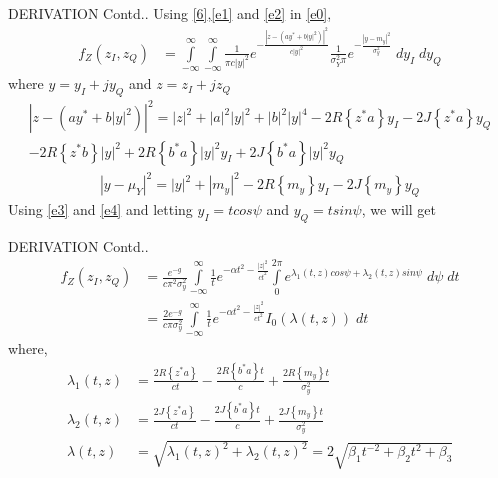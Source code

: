 \documentclass{beamer}
\providecommand{\brak}[1]{\ensuremath{\left(#1\right)}}
\providecommand{\cbrak}[1]{\ensuremath{\left\{#1\right\}}}
\begin{document}
\begin{frame}{DERIVATION Contd..}
    Using \eqref{6},\eqref{e1} and \eqref{e2} in \eqref{e0},
    \begin{align}
         f_{Z}\brak{z_I,z_Q}&=\int\limits_{-\infty}^{\infty}\int\limits_{-\infty}^{\infty}\frac{1}{\pi c|y|^2}e^{-\frac{|{z-\brak{ay^*+b|y|^2}}|^2}{c|y|^2}}\frac{1}{\sigma_Y^2\pi}e^{-\frac{|{y-m_y}|^2}{\sigma_y^2}} \;dy_I\;dy_Q
    \end{align}
    where $y=y_I+jy_Q$ and $z=z_I+jz_Q$
    \begin{multline}
        |{z-\brak{a y^*+b|y|^2}}|^2=|z|^2+|a|^2|y|^2+|b|^2|y|^4-2R\cbrak{z^*a}y_I-2J\cbrak{z^*a}y_Q\\-2R\cbrak{z^*b}|y|^2+2R\cbrak{b^*a}|y|^2y_I+2J\cbrak{b^*a}|y|^2y_Q\label{e3}
    \end{multline}
    \begin{align}
        |{y-\mu_Y}|^2=|y|^2+|m_y|^2-2R\cbrak{m_y}y_I-2J\cbrak{m_y}y_Q\label{e4}
    \end{align}
    Using \eqref{e3} and \eqref{e4} and letting $y_I=t cos\psi$ and $y_Q=t sin\psi$, we will get
\end{frame}
\begin{frame}{DERIVATION Contd..}
     \begin{align}
         f_{Z}\brak{z_I,z_Q}&=\frac{e^{-g}}{c\pi^2\sigma_y^2}\int\limits_{-\infty}^{\infty}\frac{1}{t}e^{-\alpha t^2-\frac{|z|^2}{ct^2}}\int\limits_0^{2\pi}e^{\lambda_1(t,z)cos\psi+\lambda_2(t,z)sin\psi}\;d\psi\;dt\\
         &=\frac{2e^{-g}}{c\pi\sigma_y^2}\int\limits_{-\infty}^{\infty}\frac{1}{t}e^{-\alpha t^2-\frac{|z|^2}{ct^2}}I_0(\lambda(t,z))\;dt\label{e7}
     \end{align}
     where,
     \begin{align}
         \lambda_1(t,z)&=\frac{2R\cbrak{z^*a}}{ct}-\frac{2R\cbrak{b^*a}t}{c}+\frac{2R\cbrak{m_y}t}{\sigma_y^2}\\
         \lambda_2(t,z)&=\frac{2J\cbrak{z^*a}}{ct}-\frac{2J\cbrak{b^*a}t}{c}+\frac{2J\cbrak{m_y}t}{\sigma_y^2}\\
         \lambda(t,z)&=\sqrt{\lambda_1(t,z)^2+\lambda_2(t,z)^2}=2\sqrt{\beta_1 t^{-2}+\beta_2 t^2+ \beta_3}
     \end{align}
\end{frame}
\end{document}
